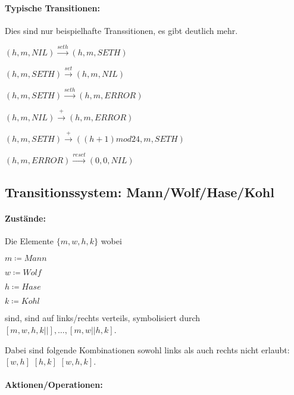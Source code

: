 \documentclass[12pt]{scrreprt}
\begin{document}
                \paragraph{Typische Transitionen:}

                    Dies sind nur beispielhafte Transsitionen, es gibt deutlich mehr.

                    $ (h, m, NIL) \xrightarrow{seth} (h, m, SETH) $

                    $ (h, m, SETH) \xrightarrow{set} (h, m, NIL) $

                    $ (h, m, SETH) \xrightarrow{seth} (h, m, ERROR) $

                    $ (h, m, NIL) \xrightarrow{+} (h, m, ERROR) $

                    $ (h, m, SETH) \xrightarrow{+} ((h + 1) mod 24, m, SETH) $

                    $ (h, m, ERROR) \xrightarrow{reset} (0, 0, NIL) $


            \subsection{Transitionssystem: Mann/Wolf/Hase/Kohl}
                \label{ss:einfuehrung_beispiel_mwhk}

                \paragraph{Zustände:}

                    Die Elemente $ \{ m, w, h, k \} $ wobei

                    $ m \coloneqq Mann $

                    $ w \coloneqq Wolf $

                    $ h \coloneqq Hase $

                    $ k \coloneqq Kohl $

                    sind, sind auf links/rechts verteils, symbolisiert durch $ [m, w, h, k \vert\vert], \dots, [m, w \vert\vert h, k] $.

                    Dabei sind folgende Kombinationen sowohl links als auch rechts nicht erlaubt: $ [w, h] $ $ [h,k] $ $ [w, h, k] $.


                \paragraph{Aktionen/Operationen:}
\end{document}

